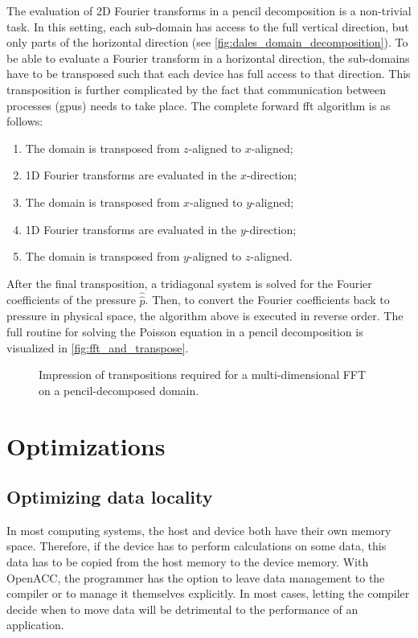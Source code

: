 The evaluation of 2D Fourier transforms in a pencil decomposition is a non-trivial task. In this setting, each sub-domain has access to the full vertical direction, but only parts of the horizontal direction (see \autoref{fig:dales_domain_decomposition}). To be able to evaluate a Fourier transform in a horizontal direction, the sub-domains have to be transposed such that each device has full access to that direction. This transposition is further complicated by the fact that communication between processes (\acrshort{gpu}s) needs to take place. The complete forward \acrshort{fft} algorithm is as follows:

\begin{enumerate}
  \item The domain is transposed from $z$-aligned to $x$-aligned;
  \item 1D Fourier transforms are evaluated in the $x$-direction;
  \item The domain is transposed from $x$-aligned to $y$-aligned;
  \item 1D Fourier transforms are evaluated in the $y$-direction;
  \item The domain is transposed from $y$-aligned to $z$-aligned.
\end{enumerate}

After the final transposition, a tridiagonal system is solved for the Fourier coefficients of the pressure $\hat{\hat{p}}$. Then, to convert the Fourier coefficients back to pressure in physical space, the algorithm above is executed in reverse order. The full routine for solving the Poisson equation in a pencil decomposition is visualized in \autoref{fig:fft_and_transpose}.

\begin{figure}[H]
  \centering
  
  \caption{Impression of transpositions required for a multi-dimensional FFT on a pencil-decomposed domain.}
  \label{fig:fft_and_transpose}
\end{figure}

\section{Optimizations}

\subsection{Optimizing data locality}
In most computing systems, the host and device both have their own memory space. Therefore, if the device has to perform calculations on some data, this data has to be copied from the host memory to the device memory. With OpenACC, the programmer has the option to leave data management to the compiler or to manage it themselves explicitly. In most cases, letting the compiler decide when to move data will be detrimental to the performance of an application.

